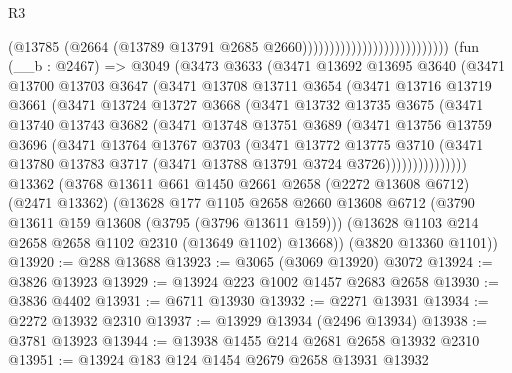 \begin{lexlean}{R3}
\begin{coremodule}
                                                    (@13785
                                                      (@2664
                                                        (@13789
                                                          @13791
                                                          @2685
                                                          @2660)))))))))))))))))))))))))))
    (fun (__b : @2467) =>
    @3049
      (@3473
        @3633
        (@3471
          @13692
          @13695
          @3640
          (@3471
            @13700
            @13703
            @3647
            (@3471
              @13708
              @13711
              @3654
              (@3471
                @13716
                @13719
                @3661
                (@3471
                  @13724
                  @13727
                  @3668
                  (@3471
                    @13732
                    @13735
                    @3675
                    (@3471
                      @13740
                      @13743
                      @3682
                      (@3471
                        @13748
                        @13751
                        @3689
                        (@3471
                          @13756
                          @13759
                          @3696
                          (@3471
                            @13764
                            @13767
                            @3703
                            (@3471
                              @13772
                              @13775
                              @3710
                              (@3471
                                @13780
                                @13783
                                @3717
                                (@3471 @13788 @13791 @3724 @3726)))))))))))))))
    @13362
    (@3768
      @13611
      @661
      @1450
      @2661
      @2658
      (@2272 @13608 @6712)
      (@2471 @13362)
      (@13628
        @177
        @1105
        @2658
        @2660
        @13608
        @6712
        (@3790 @13611 @159 @13608 (@3795 (@3796 @13611 @159)))
        (@13628 @1103 @214 @2658 @2658 @1102 @2310 (@13649 @1102) @13668))
      (@3820 @13360 @1101))
@13920 := @288 @13688
@13923 := @3065 (@3069 @13920) @3072
@13924 := @3826 @13923
@13929 := @13924 @223 @1002 @1457 @2683 @2658
@13930 := @3836 @4402
@13931 := @6711 @13930
@13932 := @2271 @13931
@13934 := @2272 @13932 @2310
@13937 := @13929 @13934 (@2496 @13934)
@13938 := @3781 @13923
@13944 := @13938 @1455 @214 @2681 @2658 @13932 @2310
@13951 := @13924 @183 @124 @1454 @2679 @2658 @13931 @13932

\end{coremodule}
\end{lexlean}
